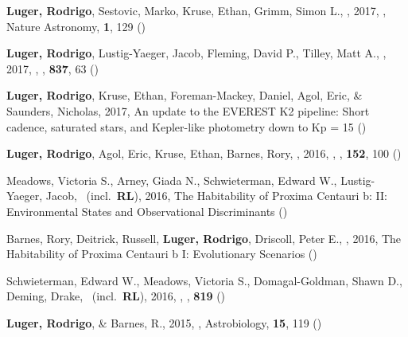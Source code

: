 \item[{\color{numcolor}\scriptsize12}] \textbf{Luger, Rodrigo}, Sestovic, Marko, Kruse, Ethan, Grimm, Simon L., \etal, 2017, , Nature Astronomy, \textbf{1}, 129 ()

\item[{\color{numcolor}\scriptsize5}] \textbf{Luger, Rodrigo}, Lustig-Yaeger, Jacob, Fleming, David P., Tilley, Matt A., \etal, 2017, , \apj, \textbf{837}, 63 ()

\item[{\color{numcolor}\scriptsize6}] \textbf{Luger, Rodrigo}, Kruse, Ethan, Foreman-Mackey, Daniel, Agol, Eric, \& Saunders, Nicholas, 2017, An update to the EVEREST K2 pipeline: Short cadence, saturated stars, and Kepler-like photometry down to Kp = 15 ()

\item[{\color{numcolor}\scriptsize29}] \textbf{Luger, Rodrigo}, Agol, Eric, Kruse, Ethan, Barnes, Rory, \etal, 2016, , \aj, \textbf{152}, 100 ()

\item[{\color{numcolor}\scriptsize19}] Meadows, Victoria S., Arney, Giada N., Schwieterman, Edward W., Lustig-Yaeger, Jacob, \etal\ (incl.\ \textbf{RL}), 2016, The Habitability of Proxima Centauri b: II: Environmental States and Observational Discriminants ()

\item[{\color{numcolor}\scriptsize19}] Barnes, Rory, Deitrick, Russell, \textbf{Luger, Rodrigo}, Driscoll, Peter E., \etal, 2016, The Habitability of Proxima Centauri b I: Evolutionary Scenarios ()

\item[{\color{numcolor}\scriptsize20}] Schwieterman, Edward W., Meadows, Victoria S., Domagal-Goldman, Shawn D., Deming, Drake, \etal\ (incl.\ \textbf{RL}), 2016, , \apj, \textbf{819} ()

\item[{\color{numcolor}\scriptsize66}] \textbf{Luger, Rodrigo}, \& Barnes, R., 2015, , Astrobiology, \textbf{15}, 119 ()

